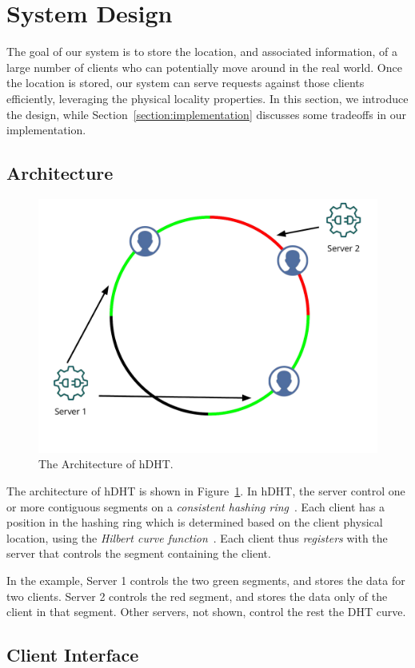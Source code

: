 \section{System Design} \label{section:design}

The goal of our system is to store the location, and associated information, of a large number of clients who can potentially move around in the real world.
Once the location is stored, our system can serve requests against those clients efficiently, leveraging the physical locality properties.
In this section, we introduce the design, while Section~\ref{section:implementation} discusses some tradeoffs in our implementation.

\subsection{Architecture}

\begin{figure}
\centering
\includegraphics[width=0.6\linewidth]{figures/arch.pdf}
\caption{The Architecture of hDHT.}
\label{fig:arch}
\end{figure}

The architecture of hDHT is shown in Figure~\ref{fig:arch}.
In hDHT, the server control one or more contiguous segments on a \textit{consistent hashing ring}~\cite{}.
Each client has a position in the hashing ring which is determined based on the client physical location, using the \textit{Hilbert curve function}~\cite{}.
Each client thus \textit{registers} with the server that controls the segment containing the client.

In the example, Server 1 controls the two green segments, and stores the data for two clients.
Server 2 controls the red segment, and stores the data only of the client in that segment.
Other servers, not shown, control the rest the DHT curve.

\subsection{Client Interface}

